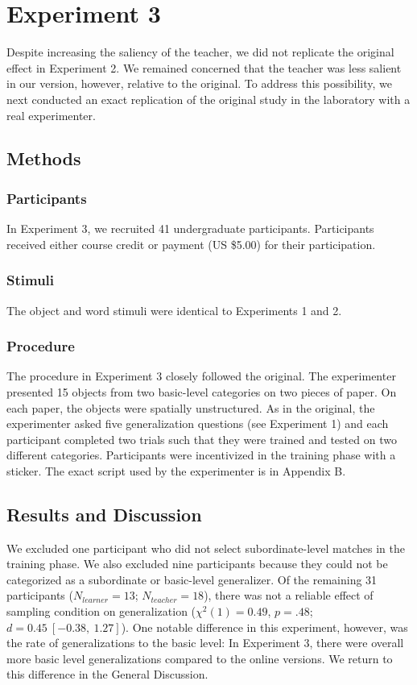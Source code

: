 \documentclass[man]{apa2}
\begin{document}
\section{Experiment 3}
Despite increasing the saliency of the teacher, we did not replicate the original effect in Experiment 2. We remained concerned that the teacher was less salient in our version, however, relative to the original. To address this possibility, we next conducted an exact replication of the original study in the laboratory with a real experimenter.

\subsection{Methods}

\subsubsection{Participants} In Experiment 3, we recruited 41 undergraduate participants. Participants received either course credit or payment (US \$5.00) for their participation. 

\subsubsection{Stimuli}
The object and word stimuli were identical to Experiments 1 and 2. 

\subsubsection{Procedure}
The procedure in Experiment 3 closely followed the original. The experimenter presented 15 objects from two basic-level categories on two pieces of paper. On each paper, the objects were spatially unstructured. As in the original, the experimenter asked five generalization questions (see Experiment 1) and each participant completed two trials such that they were trained and tested on two different categories. Participants were incentivized in the training phase with a sticker. The exact script used by the experimenter is in Appendix B. 

\subsection{Results and Discussion}
We excluded one participant who did not select subordinate-level matches in the training phase. We also excluded nine participants because they could not be categorized as a subordinate or basic-level generalizer. Of the remaining 31 participants ($N_{learner} = 13$; $N_{teacher} = 18$), there was not a reliable effect of sampling condition on generalization ($\chi^2(1) = 0.49$, $p = .48$; $d = 0.45\ [-0.38,\ 1.27]$). One notable difference in this experiment, however, was the rate of generalizations to the basic level: In Experiment 3, there were overall more basic level generalizations compared to the online versions. We return to this difference in the General Discussion.
\end{document}
